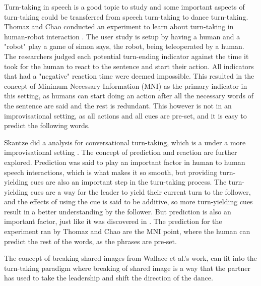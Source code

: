 \documentclass[final,5p,times,twocolumn,authoryear]{article}
\begin{document}
Turn-taking in speech is a good topic to study and some important
aspects of turn-taking could be transferred from speech turn-taking to
dance turn-taking. 
Thomaz and Chao conducted an experiment to learn about
turn-taking in human-robot interaction \cite{Thomaz2011}. The user study is setup by having a human and a
"robot" play a game of simon says, the robot, being teleoperated by a human. The researchers judged each
potential turn-ending indicator against the time it took for the human
to react to the sentence and start their action. All indicators that had
a "negative" reaction time were deemed impossible. This
resulted in the concept of Minimum Necessary Information (MNI) as the
primary indicator in this setting, as humans can start doing an action
after all the necessary words of the sentence are said and the rest is
redundant. This however is not in an improvisational setting, as all
actions and all cues are pre-set, and it is easy to predict the
following words. 

Skantze did a analysis for conversational turn-taking, which is a under
a more improvisational setting \cite{Skantze2021}. The concept of prediction and reaction
are further explored. Prediction was said to play an important factor in
human to human speech interactions, which is what makes it so smooth,
but providing turn-yielding cues are also an important step in the
turn-taking process. The turn-yielding cues are a way for the leader to
yield their current turn to the follower, and the effects of using the
cue is said to be additive, so more turn-yielding cues result in a
better understanding by the follower. But prediction is also an
important factor, just like it was discovered in \cite{Thomaz2011}. The
prediction for the experiment ran by Thomaz and Chao are the MNI point,
where the human can predict the rest of the words, as the phrases are
pre-set.

The concept of breaking shared images from Wallace et al.'s work, can
fit into the turn-taking paradigm where breaking of shared image is a
way that the partner has used to take the leadership and shift the
direction of the dance.
\end{document}
